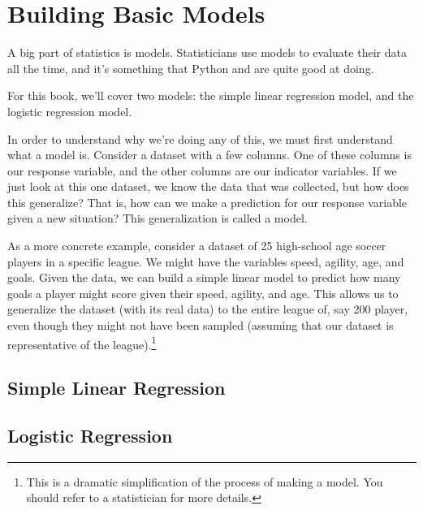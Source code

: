 \section{Building Basic Models}
A big part of statistics is models. Statisticians use models to evaluate their data all the time, and it's something that Python and  are quite good at doing.\par
For this book, we'll cover two models: the simple linear regression model, and the logistic regression model.\par
In order to understand why we're doing any of this, we must first understand what a model is. Consider a dataset with a few columns. One of these columns is our response variable, and the other columns are our indicator variables. If we just look at this one dataset, we know the data that was collected, but how does this generalize? That is, how can we make a prediction for our response variable given a new situation? This generalization is called a model.\par
As a more concrete example, consider a dataset of 25 high-school age soccer players in a specific league. We might have the variables  speed, agility, age, and goals. Given the data, we can build a simple linear model to predict how many goals a player might score given their speed, agility, and age. This allows us to generalize the dataset (with its real data) to the entire league of, say 200 player, even though they might not have been sampled (assuming that our dataset is representative of the league).\footnote{This is a dramatic simplification of the process of making a model. You should refer to a statistician for more details.}
\subsection{Simple Linear Regression}
\subsection{Logistic Regression}
